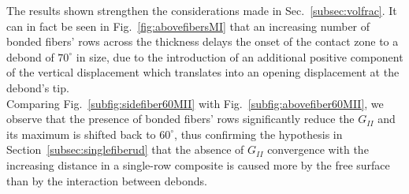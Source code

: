 \documentclass[review]{elsarticle}
\begin{document}
The results shown strengthen the considerations made in Sec.~\ref{subsec:volfrac}. It can in fact be seen in Fig.~\ref{fig:abovefibersMI} that an increasing number of bonded fibers' rows across the thickness delays the onset of the contact zone to a debond of $70^{\circ}$ in size, due to the introduction of an additional positive component of the vertical displacement which translates into an opening displacement at the debond's tip.\\
Comparing Fig.~\ref{subfig:sidefiber60MII} with Fig.~\ref{subfig:abovefiber60MII}, we observe that the presence of bonded fibers' rows significantly reduce the $G_{II}$ and its maximum is shifted back to $60^{\circ}$, thus confirming the hypothesis in Section~\ref{subsec:singlefiberud} that the absence of $G_{II}$ convergence with the increasing distance in a single-row composite is caused more by the free surface than by the interaction between debonds.
\end{document}

